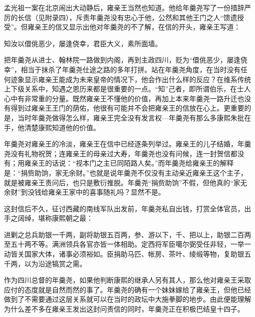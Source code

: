 孟光祖一案在北京闹出大动静后，雍亲王当然也知道。他给年羹尧写了一份措辞严厉的长信（见附录四），斥责年羹尧没有忠心于他，公然和其他王门之人“馈遗授受”。但雍亲王的信又显示出他对年羹尧的不了解，在信的开头，雍亲王写道：



\begin{bookquote}知汝以儇佻恶少，屡逢侥幸，君臣大义，素所面墙。\end{bookquote}


把年羹尧从进士、翰林院一路做到内阁，再到主政四川，贬为“儇佻恶少，屡逢侥幸”，相当于抹杀了年羹尧仕途之路的多年打拼。站在年羹尧角度，在当时没有任何迹象显示雍亲王能成为未来皇帝的情况下，他会作出什么样的反应？在维系传统上下级关系中，知遇之恩历来都是很重要的一点。“知”己者，即所谓伯乐，在士人心中有非常重的分量。既然雍亲王不懂他的价值，再加上本来年羹尧一路升迁也没有得到过雍亲王王门的荫佑，他很有可能并不会把雍亲王的信放在心上。更重要的是，当时年羹尧做得怎么样，雍亲王完全没有发言权—年羹尧有那么多康熙朱批在手，他清楚康熙知道他的价值。



年羹尧对雍亲王的冷淡，雍亲王在信中已经逐条列举过。雍亲王的儿子结婚，年羹尧没有礼物祝贺；连雍亲王的母亲过大寿，年羹尧也没有问候，连一封贺信都没有；用雍亲王的话说：“视本门之主已同陌路人矣。”而年羹尧给雍亲王的解释是：“捐赀助饷，家无余财。”也就是说年羹尧不仅没有主动亲近雍亲王这个主子，就是被雍亲王责问后，也只是敷衍推脱。年羹尧“捐赀助饷”不假，但他真的“家无余财”到没钱给雍亲王家中的喜事随礼吗？显然不是。



这封信后不久，征讨西藏的南线军队出发前，年羹尧私自出钱，打赏全体官员，出手之阔绰，堪称康熙朝之最：



\begin{bookquote}进剿之总兵助银一千两，副将助银五百两，参、游以下，千、把以上，助银二百两至五十两不等。满洲领兵各官亦皆一体相助。定西将军臣噶尔弼受任非轻，一举一动皆关国家大体，诸事必须裕如。臣捐助马匹、帐房、茶叶、绫缎等物，复助银五千两，以为沿途犒赏之需。\end{bookquote}


作为四川总督的年羹尧，如果他判断康熙的继承人另有其人，那么他对雍亲王采取应付的态度就是自然而然的事了。年羹尧的确有一个妹妹嫁给了雍亲王，但他已经做到了不需要通过这层关系就可以在当时的政坛中大施拳脚的地步。由此便能理解为什么差不多在雍亲王发出这封问责信的同时，年羹尧正在积极巴结皇十四子。


